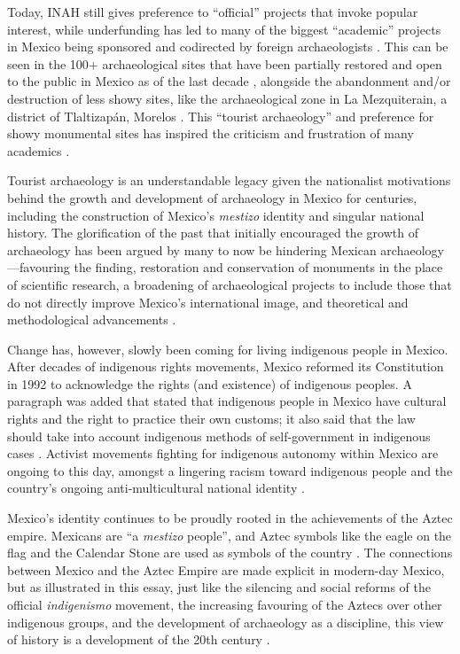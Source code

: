 Today, INAH still gives preference to “official” projects that invoke popular interest, while underfunding has led to many of the biggest “academic” projects in Mexico being sponsored and codirected by foreign archaeologists \parencites{Gomez2007}[277-278]{Trigger2006}. 
This can be seen in the 100+ archaeological sites that have been partially restored and open to the public in Mexico as of the last decade \parencite[277-278]{Trigger2006}, 
alongside the abandonment and/or destruction of less showy sites, like the archaeological zone in La Mezquiterain, a district of Tlaltizapán, Morelos \parencite{Giles2015}. 
This “tourist archaeology” and preference for showy monumental sites has inspired the criticism and frustration of many academics \parencites{Gomez2007}{Lopez2010}[30]{Sanders2000}. 

Tourist archaeology is an understandable legacy given the nationalist motivations behind the growth and development of archaeology in Mexico for centuries, including the construction of Mexico’s \textit{mestizo} identity and singular national history. The glorification of the past that initially encouraged the growth of archaeology has been argued by many to now be hindering Mexican archaeology—favouring the finding, restoration and conservation of monuments in the place of scientific research, a broadening of archaeological projects to include those that do not directly improve Mexico’s international image, and theoretical and methodological advancements \parencites{Gandara1981}{Gandara1987}{Gomez2007}{Lopez2010}.

Change has, however, slowly been coming for living indigenous people in Mexico. After decades of indigenous rights movements, Mexico reformed its Constitution in 1992 to acknowledge the rights (and existence) of indigenous peoples. A paragraph was added that stated that indigenous people in Mexico have cultural rights and the right to practice their own customs; it also said that the law should take into account indigenous methods of self-government in indigenous cases \parencite[59]{Ortiz1996}. 
Activist movements fighting for indigenous autonomy within Mexico are ongoing to this day, amongst a lingering racism toward indigenous people and the country’s ongoing anti-multicultural national identity \parencite[93-95]{Hernandez2002}. 

Mexico’s identity continues to be proudly rooted in the achievements of the Aztec empire. Mexicans are “a \textit{mestizo} people”, and Aztec symbols like the eagle on the flag and the Calendar Stone are used as symbols of the country \parencites[335]{Caballero2008}[234]{Fowler1987}[227]{Trigger2006}. 
The connections between Mexico and the Aztec Empire are made explicit in modern-day Mexico, but as illustrated in this essay, just like the silencing and social reforms of the official \textit{indigenismo} movement, the increasing favouring of the Aztecs over other indigenous groups, and the development of archaeology as a discipline, this view of history is a development of the 20th century \parencite[329]{Caballero2008}.

